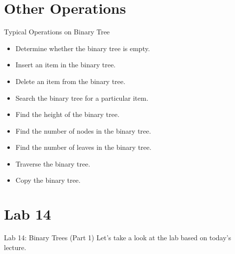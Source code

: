 \documentclass[14pt,aspectratio=1610]{beamer}
\begin{document}
\section{Other Operations}
\begin{frame}{Typical Operations on Binary Tree}
\begin{itemize}[<+->]
\item
  Determine whether the binary tree is empty.
\item
  Insert an item in the binary tree.
\item
  Delete an item from the binary tree.
\item
  Search the binary tree for a particular item.
\item
  Find the height of the binary tree.
\item
  Find the number of nodes in the binary tree.
\item
  Find the number of leaves in the binary tree.
\item
  Traverse the binary tree.
\item
  Copy the binary tree.
\end{itemize}
\end{frame}

\section*{Lab 14}
\begin{frame}{Lab 14: Binary Trees (Part 1)}
\centering\Large
Let's take a look at the lab based on today's lecture.
\end{frame}
\end{document}
